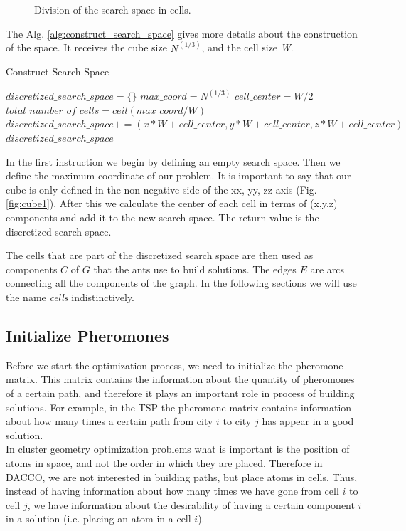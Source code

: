 \begin{figure}[t]
\begin{minipage}[b]{0.5\linewidth}
	\caption{Division of the search space in cells.}
	\label{fig:cube2}
	\end{minipage}
	\end{figure}  
	
	The Alg. \ref{alg:construct_search_space} gives more details about the construction of the space. It receives the cube size $N^{(1/3)}$, and the cell size \emph{W}.
	
	\begin{algorithm}
		\caption{Construct Search Space}
		\label{alg:construct_search_space}
		\begin{algorithmic}
		\STATE $discretized\_search\_space = \{\}$
		\STATE $max\_coord = N^{(1/3)}$
		\STATE $cell\_center = W / 2$
		\STATE $total\_number\_of\_cells = ceil(max\_coord / W)$
					\STATE $discretized\_search\_space += (x * W + cell\_center,  y * W + cell\_center, z * W + cell\_center)$
				\ENDFOR
			\ENDFOR
		\ENDFOR
		\RETURN $discretized\_search\_space$
		\end{algorithmic}
	\end{algorithm}

	In the first instruction we begin by defining an empty search space. Then we define the maximum coordinate of our problem. It is important to say that our cube is only defined in the non-negative side of the xx, yy, zz axis (Fig. \ref{fig:cube1}). After this we calculate the center of each cell in terms of (x,y,z) components and add it to the new search space. 
	The return value is the discretized search space.
	
	The cells that are part of the discretized search space are then used as components $C$ of $G$ that the ants use to build solutions. The edges $E$ are arcs connecting all the components of the graph. In the following sections we will use the name \emph{cells} indistinctively.
	
	\subsection{Initialize Pheromones}
	Before we start the optimization process, we need to initialize the pheromone matrix. This matrix contains the information about the quantity of pheromones of a certain path, and therefore it plays an important role in process of building solutions. For example, in the TSP the pheromone matrix contains information about how many times a certain path from city $i$ to city $j$ has appear in a good solution.\\
	In cluster geometry optimization problems what is important is the position of atoms in space, and not the order in which they are placed. Therefore in DACCO, we are not interested in building paths, but place atoms in cells. Thus, instead of having information about how many times we have gone from cell $i$ to cell $j$, we have information about the desirability of having a certain component $i$ in a solution (i.e. placing an atom in a cell $i$).
	

